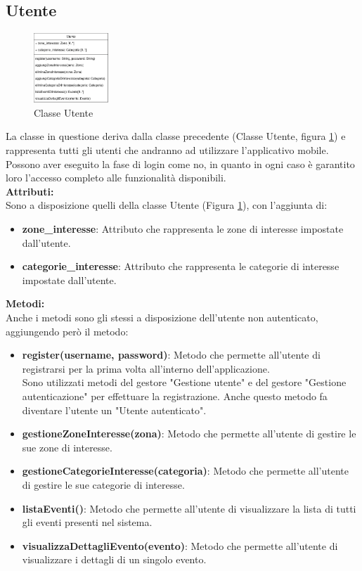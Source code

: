 \documentclass{article}
\begin{document}
\clearpage

\subsection{Utente}

\begin{figure}[htbp]
	\centering
	\includegraphics[width=0.25\textwidth]{Images/Utente-Class.png}
	\caption{Classe Utente}
	\label{fig:utente}
\end{figure}

La classe in questione deriva dalla classe precedente (Classe Utente, figura \ref{fig:utente}) e rappresenta tutti gli utenti che andranno ad utilizzare l'applicativo mobile.\\
Possono aver eseguito la fase di login come no, in quanto in ogni caso è garantito loro l'accesso completo alle funzionalità disponibili.\\

\textbf{Attributi:}\\
Sono a disposizione quelli della classe Utente (Figura \ref{fig:utente}), con l'aggiunta di:
\begin{itemize}
	\item \textbf{zone\_interesse}: Attributo che rappresenta le zone di interesse impostate dall'utente.
	\item \textbf{categorie\_interesse}: Attributo che rappresenta le categorie di interesse impostate dall'utente.\\
\end{itemize}

\textbf{Metodi:}\\
Anche i metodi sono gli stessi a disposizione dell'utente non autenticato, aggiungendo però il metodo:
\begin{itemize}
	\item \textbf{register(username, password)}: Metodo che permette all'utente di registrarsi per la prima volta all'interno dell'applicazione.\\Sono utilizzati metodi del gestore "Gestione utente" e del gestore "Gestione autenticazione" per effettuare la registrazione. Anche questo metodo fa diventare l'utente un "Utente autenticato".
	\item \textbf{gestioneZoneInteresse(zona)}: Metodo che permette all'utente di gestire le sue zone di interesse.
	\item \textbf{gestioneCategorieInteresse(categoria)}: Metodo che permette all'utente di gestire le sue categorie di interesse.
	\item \textbf{listaEventi()}: Metodo che permette all'utente di visualizzare la lista di tutti gli eventi presenti nel sistema.
	\item \textbf{visualizzaDettagliEvento(evento)}: Metodo che permette all'utente di visualizzare i dettagli di un singolo evento.
\end{itemize}
\end{document}
